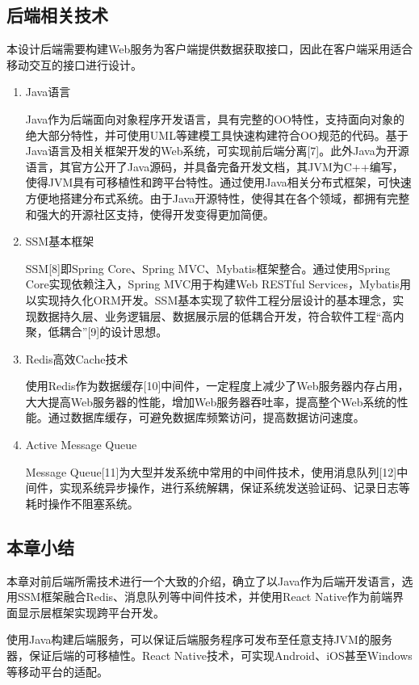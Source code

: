 \documentclass[oneside]{jufethesis}
\begin{document}
\subsection{后端相关技术}

本设计后端需要构建Web服务为客户端提供数据获取接口，因此在客户端采用适合移动交互的接口进行设计。
\begin{enumerate}[(1)]
  \item Java语言
  
  Java作为后端面向对象程序开发语言，具有完整的OO特性，支持面向对象的绝大部分特性，并可使用UML等建模工具快速构建符合OO规范的代码。基于Java语言及相关框架开发的Web系统，可实现前后端分离[7]。此外Java为开源语言，其官方公开了Java源码，并具备完备开发文档，其JVM为C++编写，使得JVM具有可移植性和跨平台特性。通过使用Java相关分布式框架，可快速方便地搭建分布式系统。由于Java开源特性，使得其在各个领域，都拥有完整和强大的开源社区支持，使得开发变得更加简便。
  \item SSM基本框架
  
  SSM[8]即Spring Core、Spring MVC、Mybatis框架整合。通过使用Spring Core实现依赖注入，Spring MVC用于构建Web RESTful Services，Mybatis用以实现持久化ORM开发。SSM基本实现了软件工程分层设计的基本理念，实现数据持久层、业务逻辑层、数据展示层的低耦合开发，符合软件工程“高内聚，低耦合”[9]的设计思想。

  \item Redis高效Cache技术
  
  使用Redis作为数据缓存[10]中间件，一定程度上减少了Web服务器内存占用，大大提高Web服务器的性能，增加Web服务器吞吐率，提高整个Web系统的性能。通过数据库缓存，可避免数据库频繁访问，提高数据访问速度。
  \item Active Message Queue

  Message Queue[11]为大型并发系统中常用的中间件技术，使用消息队列[12]中间件，实现系统异步操作，进行系统解耦，保证系统发送验证码、记录日志等耗时操作不阻塞系统。

\end{enumerate}

\subsection{本章小结}

本章对前后端所需技术进行一个大致的介绍，确立了以Java作为后端开发语言，选用SSM框架融合Redis、消息队列等中间件技术，并使用React Native作为前端界面显示层框架实现跨平台开发。

使用Java构建后端服务，可以保证后端服务程序可发布至任意支持JVM的服务器，保证后端的可移植性。React Native技术，可实现Android、iOS甚至Windows等移动平台的适配。
\end{document}
